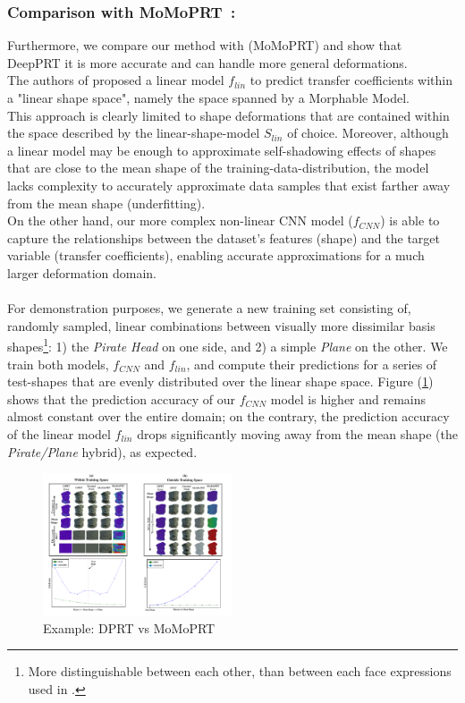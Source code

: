 \subsubsection*{\textbf{Comparison with MoMoPRT}~:}
Furthermore, we compare our method with \cite{MoMoPRT} (MoMoPRT) and show that DeepPRT it is more accurate and can handle more general deformations. \\
The authors of \cite{MoMoPRT} proposed a linear model $f_{lin}$ to predict transfer coefficients within a "linear shape space", namely the space spanned by a Morphable Model.\\
This approach is clearly limited to shape deformations that are contained within the space described by the linear-shape-model $S_{lin}$ of choice. Moreover, although a linear model may be enough to approximate self-shadowing effects of shapes that are close to the mean shape of the training-data-distribution, the model lacks complexity to accurately approximate data samples that exist farther away from the mean shape (underfitting).  
\\
On the other hand, our more complex non-linear CNN model ($f_{CNN}$) is able to capture the relationships between the dataset's features (shape) and the target variable (transfer coefficients), enabling accurate approximations for a much larger deformation domain.\\
\\
For demonstration purposes, we generate a new training set consisting of, randomly sampled, linear combinations between visually more dissimilar basis shapes\footnote{More distinguishable between each other, than between each face expressions used in \cite{MoMo}.}: 1) the \textit{Pirate Head } on one side, and 2)  a simple \textit{Plane} on the other. We train both models, $f_{CNN}$ and $f_{lin}$, and compute their predictions for a series of test-shapes that are evenly distributed over the linear shape space. Figure (\ref{Fig:DPRT vs MoMoPRT A}) shows that the prediction accuracy of our $f_{CNN}$ model is higher and remains almost constant over the entire domain; on the contrary, the prediction accuracy of the linear model $f_{lin}$ drops significantly moving away from the mean shape (the \textit{Pirate/Plane} hybrid), as expected. 
\begin{figure}[H]
  \centering
    \includegraphics[width=0.5\textwidth]{Figures/DPRT_vs_MoMoPRT_a.pdf}
     \caption{Example: DPRT vs MoMoPRT}
     \label{Fig:DPRT vs MoMoPRT A}
\end{figure}
